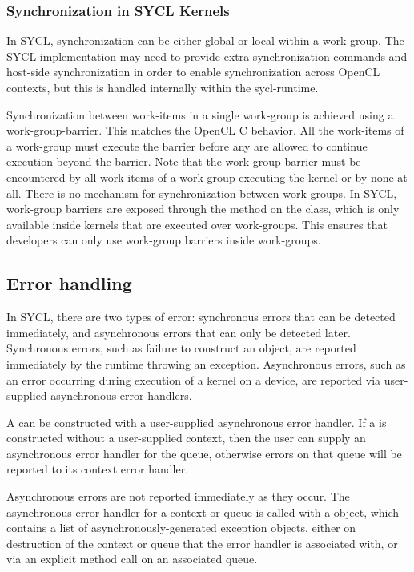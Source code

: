 \subsubsection{Synchronization in SYCL Kernels}

In SYCL, synchronization can be either global or local within a
\gls{work-group}.  The SYCL implementation may need to provide extra
synchronization commands and host-side synchronization in order to
enable synchronization across OpenCL contexts, but this is handled
internally within the \gls{sycl-runtime}.

Synchronization between work-items in a single work-group is achieved
using a \gls{work-group-barrier}. This matches the OpenCL C behavior. All
the work-items of a work-group must execute the barrier before any are
allowed to continue execution beyond the barrier. Note that the
work-group barrier must be encountered by all work-items of a
work-group executing the kernel or by none at all. There is no
mechanism for synchronization between work-groups. In SYCL, work-group
barriers are exposed through the method on the
 class, 
which is only available inside
kernels that are executed over work-groups. This ensures that
developers can only use work-group barriers inside work-groups.

\subsection{Error handling}

In SYCL, there are two types of error: synchronous errors that can be
detected immediately, and asynchronous errors that can only be
detected later.  Synchronous errors, such as failure to construct an
object, are reported immediately by the runtime throwing an
exception. Asynchronous errors, such as an error occurring during
execution of a kernel on a device, are reported via user-supplied
asynchronous error-handlers.

A  can be constructed with a
user-supplied asynchronous error handler. If a 
is constructed without a user-supplied context, then the user can supply
an asynchronous error handler for the queue, otherwise errors on that
queue will be reported to its context error handler.

Asynchronous errors are not reported immediately as they occur. The
asynchronous error handler for a context or queue is called with a
 object, which contains a list of
asynchronously-generated exception objects, either on destruction of
the context or queue that the error handler is associated with, or via
an explicit  method call on an associated
queue. 

